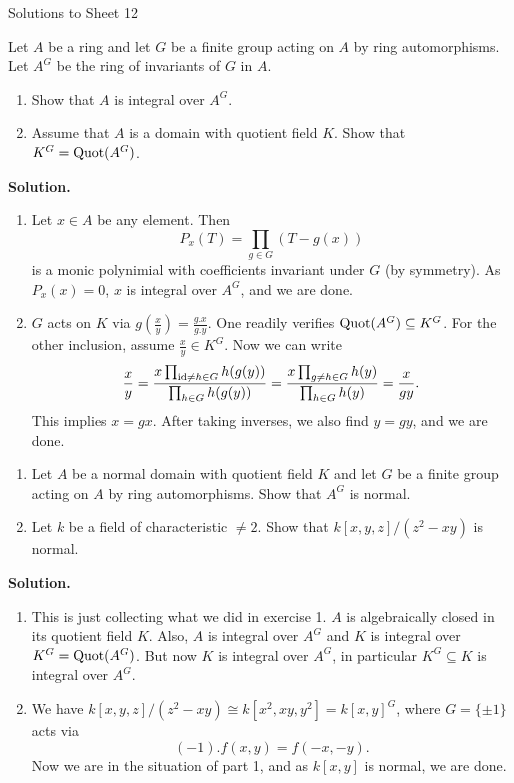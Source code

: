 \documentclass[a4paper,11pt]{article}
\begin{document}
\begin{center}
    \huge{Solutions to Sheet 12}
\end{center}

Let $A$ be a ring and let $G$ be a finite group acting on $A$ by ring automorphisms.
Let $A^G$ be the ring of invariants of $G$ in $A$.
\begin{enumerate}
    \item Show that $A$ is integral over $A^G$.
    \item Assume that $A$ is a domain with quotient field $K$. Show that $K^G = 
        \mathrm{Quot}(A^G)$. 
\end{enumerate}
\textbf{Solution.}
\begin{enumerate}
    \item Let $x \in A$ be any element. Then 
        \begin{equation*}
            P_x(T) = \prod_{g \in G}(T-g(x))
        \end{equation*}
        is a monic polynimial with coefficients invariant under $G$ (by symmetry). 
        As $P_x(x) = 0$, $x$ is integral over $A^G$, and we are done.
    \item $G$ acts on $K$ via $g (\frac xy) = \frac{g.x}{g.y}$. One readily 
        verifies $\mathrm{Quot}(A^G) \subseteq K^G$. For the other inclusion, assume 
        $\frac xy \in K^G$. Now we can write
        \begin{equation*}
            \frac {x}{y} = \frac {x\prod_{\operatorname{id} \neq h \in G} h(g(y))}{\prod_{h
                \in G} h(g(y))} = \frac {x \prod_{g \neq h \in G}
                h(y)}{\prod_{h \in G} h(y)} = \frac{x}{gy}.
        \end{equation*}
        This implies $x = gx$. After taking inverses, we also find 
        $y = gy$, and we are done.
\end{enumerate}

\begin{enumerate}
    \item Let $A$ be a normal domain with quotient field $K$ and let $G$ be a
        finite group acting on $A$ by ring automorphisms. Show that $A^G$ is
        normal.
    \item Let $k$ be a field of characteristic $\neq 2$. Show that
        $k[x,y,z]/(z^2 - xy)$ is normal. 
\end{enumerate}

\textbf{Solution.}
\begin{enumerate}
    \item This is just collecting what we did in exercise 1. $A$ is algebraically
        closed in its quotient field $K$. Also, $A$ is integral over $A^G$ and
        $K$ is integral over $K^G = \mathrm{Quot}(A^G)$. But now $K$ is integral over
        $A^G$, in particular $K^G \subseteq K$ is integral over $A^G$. 

    \item We have $k[x,y,z]/(z^2-xy) \cong k[x^2, xy, y^2] = k[x,y]^G$,
        where $G = \{\pm 1\}$ acts via 
        $$(-1).f(x,y) = f(-x,-y).$$
        Now we are in the situation of part 1, and as $k[x,y]$ is normal, we are 
        done.
\end{enumerate}
\end{document}
